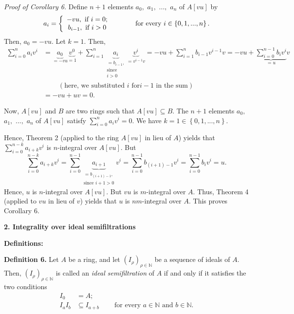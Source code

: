 \documentclass[12pt,final,notitlepage,onecolumn]{article}%
\begin{document}
\textit{Proof of Corollary 6.} Define $n+1$ elements $a_{0},$ $a_{1},$ $...,$
$a_{n}$ of $A\left[  vu\right]  $ by%
\[
a_{i}=\left\{
\begin{array}
[c]{c}%
-vu,\text{ if }i=0;\\
b_{i-1},\text{ if }i>0
\end{array}
\right.  \ \ \ \ \ \ \ \ \ \ \text{for every }i\in\left\{  0,1,...,n\right\}
.
\]
Then, $a_{0}=-vu$. Let $k=1$. Then,%
\begin{align*}
\sum\limits_{i=0}^{n}a_{i}v^{i}  &  =\underbrace{a_{0}}_{=-vu}%
\underbrace{v^{0}}_{=1}+\sum\limits_{i=1}^{n}\underbrace{a_{i}}%
_{\substack{=b_{i-1},\\\text{since}\\i>0}}\underbrace{v^{i}}_{=v^{i-1}%
v}=-vu+\sum\limits_{i=1}^{n}b_{i-1}v^{i-1}v=-vu+\underbrace{\sum
\limits_{i=0}^{n-1}b_{i}v^{i}}_{=u}v\\
&  \ \ \ \ \ \ \ \ \ \ \left(  \text{here, we substituted }i\text{ for
}i-1\text{\ in the sum}\right) \\
&  =-vu+uv=0.
\end{align*}


Now, $A\left[  vu\right]  $ and $B$ are two rings such that $A\left[
vu\right]  \subseteq B$. The $n+1$ elements $a_{0},$ $a_{1},$ $...,$ $a_{n}$
of $A\left[  vu\right]  $ satisfy $\sum\limits_{i=0}^{n}a_{i}v^{i}=0$. We have
$k=1\in\left\{  0,1,...,n\right\}  .$

Hence, Theorem 2 (applied to the ring $A\left[  vu\right]  $ in lieu of $A$)
yields that $\sum\limits_{i=0}^{n-k}a_{i+k}v^{i}$ is $n$-integral over
$A\left[  vu\right]  $. But%
\[
\sum\limits_{i=0}^{n-k}a_{i+k}v^{i}=\sum\limits_{i=0}^{n-1}\underbrace{a_{i+1}%
}_{\substack{=b_{\left(  i+1\right)  -1},\\\text{since }i+1>0}}v^{i}%
=\sum\limits_{i=0}^{n-1}b_{\left(  i+1\right)  -1}v^{i}=\sum\limits_{i=0}%
^{n-1}b_{i}v^{i}=u.
\]
Hence, $u$ is $n$-integral over $A\left[  vu\right]  $. But $vu$ is
$m$-integral over $A$. Thus, Theorem 4 (applied to $vu$ in lieu of $v$) yields
that $u$ is $nm$-integral over $A$. This proves Corollary 6.

\begin{center}
\color{blue} \textbf{2. Integrality over ideal semifiltrations} \color{black}
\end{center}

\textbf{Definitions:}

\textbf{Definition 6.} Let $A$ be a ring, and let $\left(  I_{\rho}\right)
_{\rho\in\mathbb{N}}$ be a sequence of ideals of $A$. Then, $\left(  I_{\rho
}\right)  _{\rho\in\mathbb{N}}$ is called an \textit{ideal semifiltration} of
$A$ if and only if it satisfies the two conditions%
\begin{align*}
I_{0}  &  =A;\\
I_{a}I_{b}  &  \subseteq I_{a+b}\ \ \ \ \ \ \ \ \ \ \text{for every }%
a\in\mathbb{N}\text{ and }b\in\mathbb{N}.
\end{align*}
\end{document}
